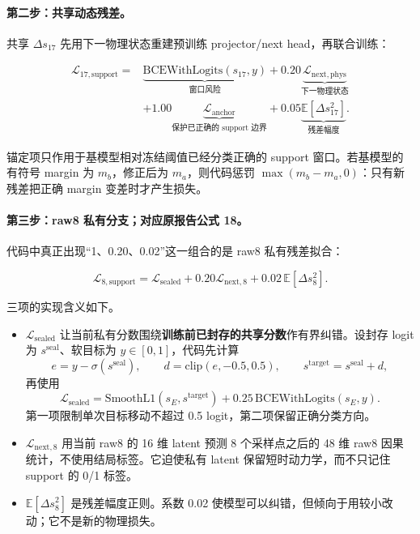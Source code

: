 \documentclass[11pt,a4paper]{article}
\begin{document}
\paragraph{第二步：共享动态残差。}
共享 \(\Delta s_{17}\) 先用下一物理状态重建预训练 projector/next head，再联合训练：

\[
\begin{aligned}
\mathcal{L}_{17,\mathrm{support}}
={}&\underbrace{\mathrm{BCEWithLogits}(s_{17},y)}_{\text{窗口风险}}
+0.20\underbrace{\mathcal{L}_{\mathrm{next,phys}}}_{\text{下一物理状态}}\\
&+1.00\underbrace{\mathcal{L}_{\mathrm{anchor}}}_{\text{保护已正确的 support 边界}}
+0.05\underbrace{\mathbb{E}[\Delta s_{17}^{2}]}_{\text{残差幅度}}.
\end{aligned}
\]

锚定项只作用于基模型相对冻结阈值已经分类正确的 support 窗口。若基模型的有符号 margin 为 \(m_b\)，修正后为 \(m_a\)，则代码惩罚 \(\max(m_b-m_a,0)\)：只有新残差把正确 margin 变差时才产生损失。

\paragraph{第三步：raw8 私有分支；对应原报告公式 18。}
代码中真正出现“1、0.20、0.02”这一组合的是 raw8 私有残差拟合：

\begin{equation}
\mathcal{L}_{8,\mathrm{support}}
=\mathcal{L}_{\mathrm{sealed}}
 +0.20\mathcal{L}_{\mathrm{next,8}}
 +0.02\,\mathbb{E}[\Delta s_8^2].
\label{eq:support-loss}
\end{equation}

三项的实现含义如下。

\begin{itemize}
\item \(\mathcal{L}_{\mathrm{sealed}}\) 让当前私有分数围绕\textbf{训练前已封存的共享分数}作有界纠错。设封存 logit 为 \(s^{\mathrm{seal}}\)、软目标为 \(y\in[0,1]\)，代码先计算
\[
e=y-\sigma(s^{\mathrm{seal}}),\qquad
d=\mathrm{clip}(e,-0.5,0.5),\qquad
s^{\mathrm{target}}=s^{\mathrm{seal}}+d,
\]
再使用
\[
\mathcal{L}_{\mathrm{sealed}}
=\mathrm{SmoothL1}(s_E,s^{\mathrm{target}})
+0.25\,\mathrm{BCEWithLogits}(s_E,y).
\]
第一项限制单次目标移动不超过 0.5 logit，第二项保留正确分类方向。
\item \(\mathcal{L}_{\mathrm{next,8}}\) 用当前 raw8 的 16 维 latent 预测 8 个采样点之后的 48 维 raw8 因果统计，不使用结局标签。它迫使私有 latent 保留短时动力学，而不只记住 support 的 0/1 标签。
\item \(\mathbb{E}[\Delta s_8^2]\) 是残差幅度正则。系数 0.02 使模型可以纠错，但倾向于用较小改动；它不是新的物理损失。
\end{itemize}
\end{document}
